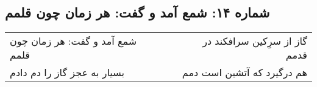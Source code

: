 \begin{center}
\section*{شماره ۱۴: شمع آمد و گفت: هر زمان چون قلمم}
\label{sec:014}
\begin{longtable}{l p{0.5cm} r}
شمع آمد و گفت: هر زمان چون قلمم
&&
گاز از سرِکین سرافکند در قدمم
\\
بسیار به عجز گاز را دم دادم
&&
هم درگیرد که آتشین است دمم
\\
\end{longtable}
\end{center}
